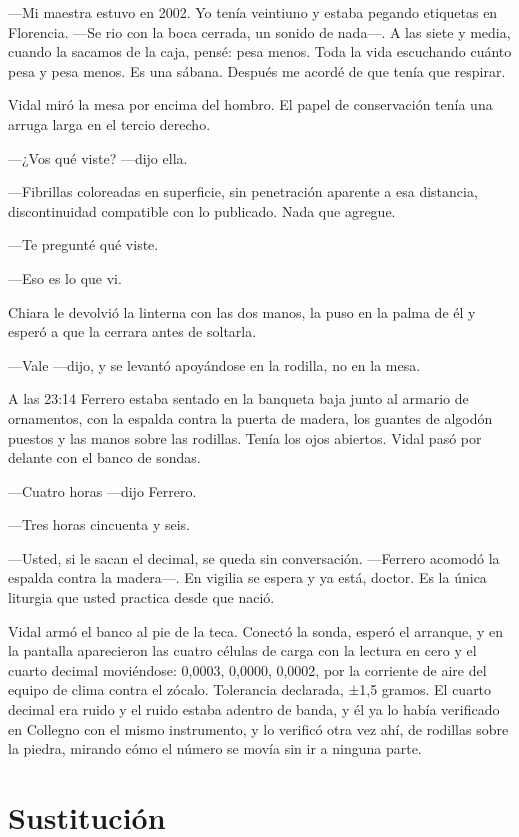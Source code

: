 ---Mi maestra estuvo en 2002. Yo tenía veintiuno y estaba pegando etiquetas en Florencia. ---Se rio con la boca cerrada, un sonido de nada---. A las siete y media, cuando la sacamos de la caja, pensé: pesa menos. Toda la vida escuchando cuánto pesa y pesa menos. Es una sábana. Después me acordé de que tenía que respirar.

Vidal miró la mesa por encima del hombro. El papel de conservación tenía una arruga larga en el tercio derecho.

---¿Vos qué viste? ---dijo ella.

---Fibrillas coloreadas en superficie, sin penetración aparente a esa distancia, discontinuidad compatible con lo publicado. Nada que agregue.

---Te pregunté qué viste.

---Eso es lo que vi.

Chiara le devolvió la linterna con las dos manos, la puso en la palma de él y esperó a que la cerrara antes de soltarla.

---Vale ---dijo, y se levantó apoyándose en la rodilla, no en la mesa.

A las 23:14 Ferrero estaba sentado en la banqueta baja junto al armario de ornamentos, con la espalda contra la puerta de madera, los guantes de algodón puestos y las manos sobre las rodillas. Tenía los ojos abiertos. Vidal pasó por delante con el banco de sondas.

---Cuatro horas ---dijo Ferrero.

---Tres horas cincuenta y seis.

---Usted, si le sacan el decimal, se queda sin conversación. ---Ferrero acomodó la espalda contra la madera---. En vigilia se espera y ya está, doctor. Es la única liturgia que usted practica desde que nació.

Vidal armó el banco al pie de la teca. Conectó la sonda, esperó el arranque, y en la pantalla aparecieron las cuatro células de carga con la lectura en cero y el cuarto decimal moviéndose: 0,0003, 0,0000, 0,0002, por la corriente de aire del equipo de clima contra el zócalo. Tolerancia declarada, ±1,5 gramos. El cuarto decimal era ruido y el ruido estaba adentro de banda, y él ya lo había verificado en Collegno con el mismo instrumento, y lo verificó otra vez ahí, de rodillas sobre la piedra, mirando cómo el número se movía sin ir a ninguna parte.

\clearpage

\chapter{Sustitución}

